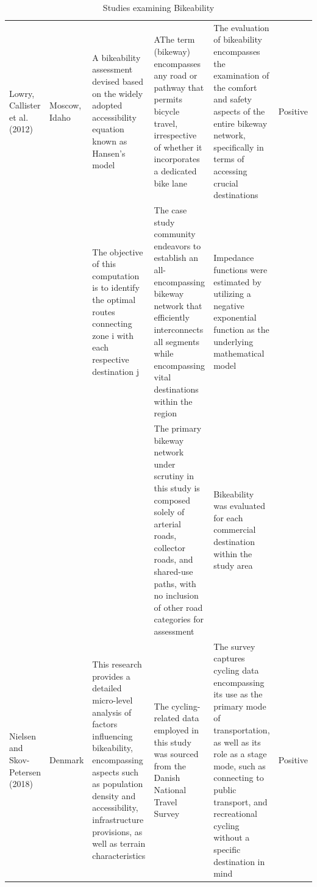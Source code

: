 \documentclass[
11pt, %
oneside, %
english, %
singlespacing, %
]{macthesis} %
\begin{document}
\begin{landscape}\begingroup\fontsize{8}{10}\selectfont

\begin{longtable}[t]{>{\raggedright\arraybackslash}p{3cm}>{\raggedright\arraybackslash}p{3cm}>{\raggedright\arraybackslash}p{3cm}>{\raggedright\arraybackslash}p{3cm}>{\raggedright\arraybackslash}p{3cm}>{\raggedright\arraybackslash}p{3cm}}
\caption{\label{tab:ch02-make-table-04}\label{tab:ch02-make-table-04}Studies examining Bikeability}\\
\toprule
\multicolumn{1}{>{\centering\arraybackslash}p{3cm}}{\textbf{Author}} & \multicolumn{1}{>{\centering\arraybackslash}p{3cm}}{\textbf{Study\_area}} & \multicolumn{1}{>{\centering\arraybackslash}p{3cm}}{\textbf{Measure}} & \multicolumn{1}{>{\centering\arraybackslash}p{3cm}}{\textbf{Data}} & \multicolumn{1}{>{\centering\arraybackslash}p{3cm}}{\textbf{Descriptions}} & \multicolumn{1}{>{\centering\arraybackslash}p{3cm}}{\textbf{positive/normative implementations}}\\
\midrule
Lowry, Callister et al. (2012) & Moscow, Idaho & A bikeability assessment devised based on the widely adopted accessibility equation known as Hansen's model & AThe term (bikeway) encompasses any road or pathway that permits bicycle travel, irrespective of whether it incorporates a dedicated bike lane & The evaluation of bikeability encompasses the examination of the comfort and safety aspects of the entire bikeway network, specifically in terms of accessing crucial destinations & Positive\\
 &  & The objective of this computation is to identify the optimal routes connecting zone i with each respective destination j & The case study community endeavors to establish an all-encompassing bikeway network that efficiently interconnects all segments while encompassing vital destinations within the region & Impedance functions were estimated by utilizing a negative exponential function as the underlying mathematical model & \\
 &  &  & The primary bikeway network under scrutiny in this study is composed solely of arterial roads, collector roads, and shared-use paths, with no inclusion of other road categories for assessment & Bikeability was evaluated for each commercial destination within the study area & \\
Nielsen and Skov-Petersen (2018) & Denmark & This research provides a detailed micro-level analysis of factors influencing bikeability, encompassing aspects such as population density and accessibility, infrastructure provisions, as well as terrain characteristics & The cycling-related data employed in this study was sourced from the Danish National Travel Survey & The survey captures cycling data encompassing its use as the primary mode of transportation, as well as its role as a stage mode, such as connecting to public transport, and recreational cycling without a specific destination in mind & Positive\\

\end{longtable}
\end{landscape}
\end{document}
